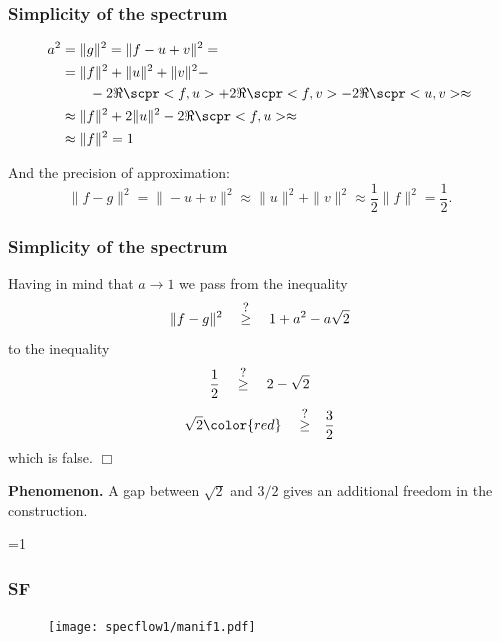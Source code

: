 \begin{frame}
  \frametitle{Simplicity of the spectrum}
  
  \begin{align*}
  a^2 &= \|g\|^2 = \|f-u+v\|^2 = \\ 
  &= \|f\|^2 + \|u\|^2 + \|v\|^2 - \\ 
  &\qquad - 2\Re\scpr<f,u> + 2\Re\scpr<f,v> - 2\Re\scpr<u,v> \approx \\
  &\approx \|f\|^2 + 2\|u\|^2 - 2\Re\scpr<f,u> \approx \\ 
  &\approx \|f\|^2 = 1 
  \end{align*}

  And the precision of approximation: 
  $$
    \|f-g\|^2 = \|-u+v\|^2 \approx \|u\|^2 + \|v\|^2 \approx \frac12 \|f\|^2 = \frac12. 
  $$

\end{frame}



\begin{frame}
  \frametitle{Simplicity of the spectrum}
  
  \def\qq{\quad  \stackrel{\text{\small ?}}\ge  \quad}

  Having in mind that $a \to 1$ we pass from the inequality 
  $$
    \|f-g\|^2 \qq 1 + a^2 - a\sqrt{2} 
  $$
  to the inequality 
  $$
    \frac12 \qq 2 - \sqrt{2} 
  $$
  $$
    \sqrt{2} {\color{red} \qq} \frac32 
  $$
  which is false. $\Box$ 
  
  \bigskip
  {\bf Phenomenon.} A gap between $\sqrt{2}$ and $3/2$ gives an additional freedom in the construction. 
    
\end{frame}












=1
\begin{frame}
  \frametitle{SF}

	\medskip	
	\begin{figure}
 		\texttt{[image: specflow1/manif1.pdf]} 
	\end{figure}

\end{frame}
\fi




